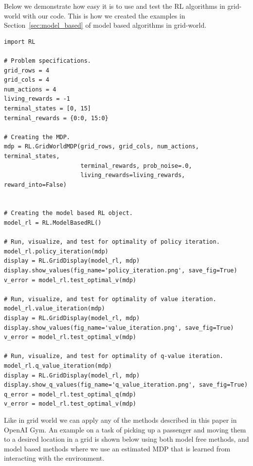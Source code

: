 \documentclass{article}
\begin{document}
Below we demonstrate how easy it is to use and test the RL algorithms in grid-world with our code. This is how we created the examples in Section~\ref{sec:model_based} of model based algorithms in grid-world.
\begin{lstlisting}
import RL

# Problem specifications.
grid_rows = 4
grid_cols = 4
num_actions = 4
living_rewards = -1
terminal_states = [0, 15]
terminal_rewards = {0:0, 15:0}

# Creating the MDP.
mdp = RL.GridWorldMDP(grid_rows, grid_cols, num_actions, terminal_states, 
                      terminal_rewards, prob_noise=.0, 
                      living_rewards=living_rewards, reward_into=False)


# Creating the model based RL object.
model_rl = RL.ModelBasedRL()

# Run, visualize, and test for optimality of policy iteration.
model_rl.policy_iteration(mdp)
display = RL.GridDisplay(model_rl, mdp)
display.show_values(fig_name='policy_iteration.png', save_fig=True)
v_error = model_rl.test_optimal_v(mdp)

# Run, visualize, and test for optimality of value iteration.
model_rl.value_iteration(mdp)
display = RL.GridDisplay(model_rl, mdp)
display.show_values(fig_name='value_iteration.png', save_fig=True)
v_error = model_rl.test_optimal_v(mdp)

# Run, visualize, and test for optimality of q-value iteration.
model_rl.q_value_iteration(mdp)
display = RL.GridDisplay(model_rl, mdp)
display.show_q_values(fig_name='q_value_iteration.png', save_fig=True)
q_error = model_rl.test_optimal_q(mdp)
v_error = model_rl.test_optimal_v(mdp)
\end{lstlisting}
Like in grid world we can apply any of the methods described in this paper in OpenAI Gym. An example on a task of picking up a passenger and moving them to a desired location in a grid is shown below using both model free methods, and model based methods where we use an estimated MDP that is learned from interacting with the environment.
\end{document}
